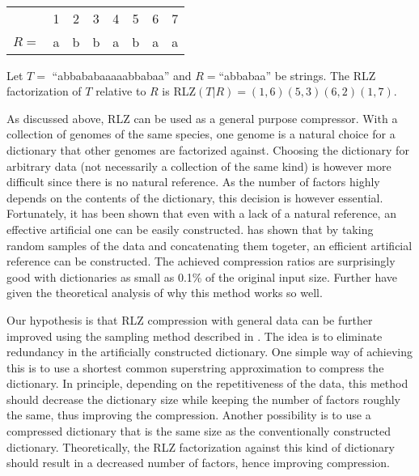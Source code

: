 \documentclass[english,twoside,censored,csm,algorithms-track-2020]{HYthesisML}
\theoremstyle{plain}
\theoremstyle{definition}
\newcounter{testexample}
\numberwithin{testexample}{chapter}
\begin{document}
\begin{testexample}
  ~\\
  \vspace{-1cm}
  \begin{center}
  \begin{tabular}[H]{r c c c c c c c}
    &1&2&3&4&5&6&7 \\
    $R=$&a&b&b&a&b&a&a \\
  \end{tabular}
  \end{center}
  Let $T=$ ``abbababaaaaabbabaa'' and $R=$``abbabaa'' be strings. The RLZ factorization of $T$
  relative to $R$ is RLZ$(T|R)=(1,6)(5,3)(6,2)(1,7)$.
\end{testexample}

As discussed above, RLZ can be used as a general purpose compressor. With a collection of
genomes of the same species, one genome is a natural choice for a dictionary that other genomes are
factorized against. Choosing the dictionary for arbitrary data (not necessarily a collection of the
same kind) is however more difficult since there is no natural reference. As the number of factors
highly depends on the contents of the dictionary, this decision is however essential. Fortunately, it has been shown
that even with a lack of a natural reference, an effective artificial one can be easily constructed.
\citep{Hoobin11} has shown that by taking random samples of the data and concatenating them togeter,
an efficient  artificial reference can be constructed. The achieved compression ratios are surprisingly
good with dictionaries as small as 0.1\% of the original input size. Further \citep{Gagie16} have
given the theoretical analysis of why this method works so well.

Our hypothesis is that RLZ compression with general data can be further improved using the
sampling method described in \citep{Hoobin11}. The idea is to eliminate redundancy in the
artificially constructed dictionary. One simple way of achieving this is to use a shortest common
superstring approximation to compress the dictionary. In principle, depending on the repetitiveness
of the data, this method should decrease the dictionary size while keeping the number of factors
roughly the same, thus improving the compression. Another possibility is to use a compressed
dictionary that is the same size as the conventionally constructed dictionary. Theoretically, the
RLZ factorization against this kind of dictionary should result in a decreased number of factors,
hence improving compression.
\end{document}
